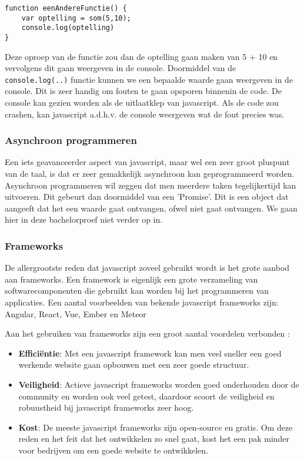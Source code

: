 \begin{lstlisting}[frame=single, caption=Een functie de som functie oproept]
function eenAndereFunctie() {
	var optelling = som(5,10);
	console.log(optelling)
}
\end{lstlisting}

Deze oproep van de functie zou dan de optelling gaan maken van 5 + 10 en vervolgens dit gaan weergeven in de console. Doormiddel van de \lstinline[basicstyle=\ttfamily\color{red}]|console.log(..)| functie kunnen we een bepaalde waarde gaan weergeven in de console. Dit is zeer handig om fouten te gaan opsporen binnenin de code. De console kan gezien worden als de uitlaatklep van javascript. Als de code zou crashen, kan javascript a.d.h.v. de console weergeven wat de fout precies was.

\subsubsection{Asynchroon programmeren}
\label{sssec:asynchroon-programmeren}
Een iets geavanceerder aspect van javascript, maar wel een zeer groot pluspunt van de taal, is dat er zeer gemakkelijk asynchroon kan geprogrammeerd worden. Asynchroon programmeren wil zeggen dat men meerdere taken tegelijkertijd kan uitvoeren. Dit gebeurt dan doormiddel van een 'Promise'. Dit is een object dat aangeeft dat het een waarde gaat ontvangen, ofwel niet gaat ontvangen. We gaan hier in deze bachelorproef niet verder op in.

\subsubsection{Frameworks}
\label{sssec:frameworks}
De allergrootste reden dat javascript zoveel gebruikt wordt is het grote aanbod aan frameworks. Een framework is eigenlijk een grote verzameling van softwarecomponenten die gebruikt kan worden bij het programmeren van applicaties. Een aantal voorbeelden van bekende javascript frameworks zijn: Angular, React, Vue, Ember en Meteor

Aan het gebruiken van frameworks zijn een groot aantal voordelen verbonden \autocite{Korotya2018}:

\begin{itemize}
	\item \textbf{Efficiëntie}: Met een javascript framework kan men veel sneller een goed werkende website gaan opbouwen met een zeer goede structuur.
	\item \textbf{Veiligheid}: Actieve javascript frameworks worden goed onderhouden door de community en worden ook veel getest, daardoor scoort de veiligheid en robuustheid bij javascript frameworks zeer hoog.
	\item \textbf{Kost}: De meeste javascript frameworks zijn open-source en gratis. Om deze reden en het feit dat het ontwikkelen zo snel gaat, kost het een pak minder voor bedrijven om een goede website te ontwikkelen.
\end{itemize}

